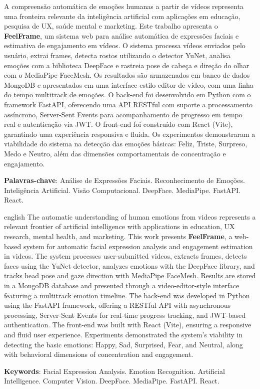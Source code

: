 \documentclass[
	12pt,
	openright,
	oneside,
	a4paper,
	english,
	brazil
	]{abntex2}
\begin{document}
\begin{resumo}
A compreensão automática de emoções humanas a partir de vídeos representa uma fronteira relevante da inteligência artificial com aplicações em educação, pesquisa de UX, saúde mental e marketing. Este trabalho apresenta o \textbf{FeelFrame}, um sistema web para análise automática de expressões faciais e estimativa de engajamento em vídeos. O sistema processa vídeos enviados pelo usuário, extrai frames, detecta rostos utilizando o detector YuNet, analisa emoções com a biblioteca DeepFace e rastreia pose de cabeça e direção do olhar com o MediaPipe FaceMesh. Os resultados são armazenados em banco de dados MongoDB e apresentados em uma interface estilo editor de vídeo, com uma linha do tempo multitrack de emoções. O back-end foi desenvolvido em Python com o framework FastAPI, oferecendo uma API RESTful com suporte a processamento assíncrono, Server-Sent Events para acompanhamento de progresso em tempo real e autenticação via JWT. O front-end foi construído com React (Vite), garantindo uma experiência responsiva e fluida. Os experimentos demonstraram a viabilidade do sistema na detecção das emoções básicas: Feliz, Triste, Surpreso, Medo e Neutro, além das dimensões comportamentais de concentração e engajamento.

\textbf{Palavras-chave}: Análise de Expressões Faciais. Reconhecimento de Emoções. Inteligência Artificial. Visão Computacional. DeepFace. MediaPipe. FastAPI. React.
\end{resumo}

\begin{resumo}[Abstract]
\begin{otherlanguage*}{english}
The automatic understanding of human emotions from videos represents a relevant frontier of artificial intelligence with applications in education, UX research, mental health, and marketing. This work presents \textbf{FeelFrame}, a web-based system for automatic facial expression analysis and engagement estimation in videos. The system processes user-submitted videos, extracts frames, detects faces using the YuNet detector, analyzes emotions with the DeepFace library, and tracks head pose and gaze direction with MediaPipe FaceMesh. Results are stored in a MongoDB database and presented through a video-editor-style interface featuring a multitrack emotion timeline. The back-end was developed in Python using the FastAPI framework, offering a RESTful API with asynchronous processing, Server-Sent Events for real-time progress tracking, and JWT-based authentication. The front-end was built with React (Vite), ensuring a responsive and fluid user experience. Experiments demonstrated the system's viability in detecting the basic emotions: Happy, Sad, Surprised, Fear, and Neutral, along with behavioral dimensions of concentration and engagement.

\vspace{\onelineskip}
\noindent
\textbf{Keywords}: Facial Expression Analysis. Emotion Recognition. Artificial Intelligence. Computer Vision. DeepFace. MediaPipe. FastAPI. React.
\end{otherlanguage*}
\end{resumo}
\end{document}
